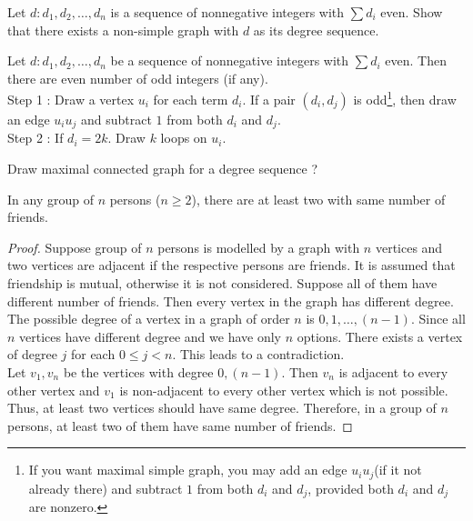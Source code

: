 \begin{exercise}
	Let $d : d_1,d_2,\dots,d_n$ is a sequence of nonnegative integers with $\sum d_i$ even. Show that there exists a non-simple graph with $d$ as its degree sequence.
\end{exercise}
	Let $d : d_1,d_2,\dots,d_n$ be a sequence of nonnegative integers with $\sum d_i$ even. Then there are even number of odd integers (if any).\\

	Step 1 : Draw a vertex $u_i$ for each term $d_i$.
	If a pair $(d_i,d_j)$ is odd\footnote{If you want maximal simple graph, you may add an edge $u_iu_j$(if it not already there) and subtract $1$ from both $d_i$ and $d_j$, provided both $d_i$ and $d_j$ are nonzero.}, then draw an edge $u_iu_j$ and subtract $1$ from both $d_i$ and $d_j$.\\

	Step 2 : If $d_i = 2k$. Draw $k$ loops on $u_i$.\\

\begin{challenge}
	Draw maximal connected graph for a degree sequence ?
\end{challenge}

\begin{application}
	In any group of $n$ persons ($n \ge 2$), there are at least two with same number of friends.
\end{application}
\begin{proof}
	Suppose group of $n$ persons is modelled by a graph with $n$ vertices and two vertices are adjacent if the respective persons are friends. It is assumed that friendship is mutual, otherwise it is not considered. Suppose all of them have different number of friends. Then every vertex in the graph has different degree.\\

	The possible degree of a vertex in a graph of order $n$ is $0,1,\dots,(n-1)$. Since all $n$ vertices have different degree and we have only $n$ options. There exists a vertex of degree $j$ for each $0 \le j < n$. This leads to a contradiction.\\

	Let $v_1,v_n$ be the vertices with degree $0,(n-1)$. Then $v_n$ is adjacent to every other vertex and $v_1$ is non-adjacent to every other vertex which is not possible. Thus, at least two vertices should have same degree. Therefore, in a group of $n$ persons, at least two of them have same number of friends.
\end{proof}

